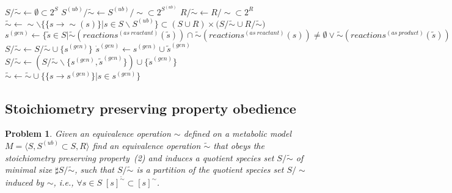 \documentclass[10pt]{bmc_article}
\newenvironment{bmcformat}{\baselineskip20pt\sloppy\setboolean{publ}{false}}{\baselineskip20pt\sloppy}
\begin{document}
\begin{bmcformat}
\begin{algorithm}[H]
\SetAlgoVlined
{}
\caption{Maximization of the Number of Species Equivalence Classes}
\BlankLine
$S/\tilde{\sim} \leftarrow \emptyset \subset 2^S$ \;
$S^{(ub)}/\tilde{\sim} \leftarrow S^{(ub)}/\sim \subset 2^{S^{(ub)}}$ \;
$R/\tilde{\sim} \leftarrow R/\sim \subset 2^R$ \;
$\tilde{\sim} \leftarrow \sim \backslash \{\{s \rightarrow \sim(s)\}|s \in S\backslash{S^{(ub)}}\} \subset (S\cup{R})\times(S/\tilde{\sim}\cup{R/\tilde{\sim})}$ \;
\BlankLine
{} {
	$s^{(gen)} \leftarrow \{\tilde{s}\in{S}|\tilde{\sim}(reactions^{(as~reactant)}(\tilde{s}))\cap\tilde{\sim}(reactions^{(as~reactant)}(s))\neq\emptyset \lor \tilde{\sim}(reactions^{(as~product)}(\tilde{s}))\cap\tilde{\sim}(reactions^{(as~product)}(s))\neq\emptyset\}$ \;
	$S/\tilde{\sim} \leftarrow S/\tilde{\sim}\cup\{s^{(gen)}\}$ \;
}
 {
	$\dot{s}^{(gen)} \leftarrow s^{(gen)} \cup \tilde{s}^{(gen)}$ \;
	$S/\tilde{\sim} \leftarrow (S/\tilde{\sim}\backslash{\{s^{(gen)}, \tilde{s}^{(gen)}\}})\cup\{\dot{s}^{(gen)}\}$ \;
}
 {
	$\tilde{\sim} \leftarrow \tilde{\sim}\cup\{\{s \rightarrow s^{(gen)}\}|s \in s^{(gen)}\}$ \;
}
\BlankLine
{}
\end{algorithm} 

\subsection*{Stoichiometry preserving property obedience}
\newtheorem{p2}{Problem}
\begin{p2}
Given an equivalence operation $\sim$ defined on a metabolic model $M=\langle S, S^{(ub)}\subset{S}, R \rangle$ find an equivalence operation $\tilde{\sim}$ that obeys the stoichiometry preserving property~(2) and induces a quotient species set $S/\tilde{\sim}$ of minimal size $\sharp S/\tilde{\sim}$, such that $S/\tilde{\sim}$ is a partition of the quotient species set $S/\sim$ induced by $\sim$, i.e., $\forall s \in S \; [s]^{\tilde{\sim}} \subset [s]^{\sim} $. 
\end{p2}

\end{bmcformat}
\end{document}
